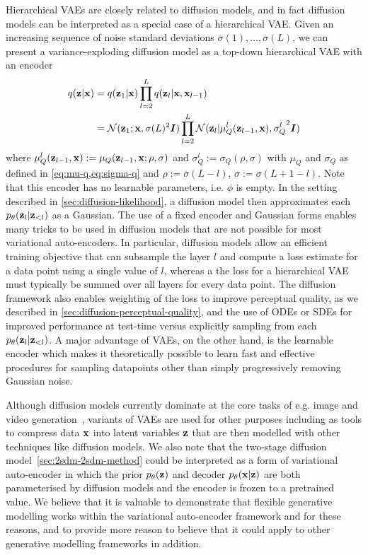 Hierarchical VAEs are closely related to diffusion models, and in fact diffusion models can be interpreted as a special case of a hierarchical VAE. Given an increasing sequence of noise standard deviations $\sigma(1),\ldots,\sigma(L)$, we can present a variance-exploding diffusion model as a top-down hierarchical VAE with an encoder
\begin{align}
    q({\mathbf{z}}|{\mathbf{x}}) &= q({\mathbf{z}}_1|{\mathbf{x}}) \prod_{l=2}^L q({\mathbf{z}}_l | {\mathbf{x}}, {\mathbf{x}}_{l-1}) \\
    &= {\mathcal{N}}( {\mathbf{z}}_1 ; {\mathbf{x}}, \sigma(L)^2 {\bm{I}} ) \prod_{l=2}^L {\mathcal{N}}( {\mathbf{z}}_l | \mu^l_Q({\mathbf{z}}_{l-1}, {\mathbf{x}}), {\sigma_Q^l}^2 {\bm{I}} )
\end{align}
where $\mu^l_Q({\mathbf{z}}_{l-1}, {\mathbf{x}}) := \mu_Q({\mathbf{z}}_{l-1}, {\mathbf{x}}; \rho, \sigma)$ and $\sigma^l_Q := \sigma_Q(\rho, \sigma)$ with $\mu_Q$ and $\sigma_Q$ as defined in \cref{eq:mu-q,eq:sigma-q} and $\rho := \sigma(L-l)$, $\sigma := \sigma(L+1-l)$. Note that this encoder has no learnable parameters, i.e. $\phi$ is empty. In the setting described in \cref{sec:diffusion-likelihood}, a diffusion model then approximates each $p_\theta({\mathbf{z}}_l|{\mathbf{z}}_{<l})$ as a Gaussian. The use of a fixed encoder and Gaussian forms enables many tricks to be used in diffusion models that are not possible for most variational auto-encoders. In particular, diffusion models allow an efficient training objective that can subsample the layer $l$ and compute a loss estimate for a data point using a single value of $l$, whereas a the loss for a hierarchical VAE must typically be summed over all layers for every data point. The diffusion framework also enables weighting of the loss to improve perceptual quality, as we described in \cref{sec:diffusion-perceptual-quality}, and the use of ODEs or SDEs for improved performance at test-time versus explicitly sampling from each $p_\theta({\mathbf{z}}_l|{\mathbf{z}}_{<l})$.
A major advantage of VAEs, on the other hand, is the learnable encoder which makes it theoretically possible to learn fast and effective procedures for sampling datapoints other than simply progressively removing Gaussian noise. 

Although diffusion models currently dominate at the core tasks of e.g. image and video generation~\citep{esser2024scaling,brooks2024video}, variants of VAEs are used for other purposes including as tools to compress data ${\mathbf{x}}$ into latent variables ${\mathbf{z}}$ that are then modelled with other techniques like diffusion models. We also note that the two-stage diffusion model~\cref{sec:2sdm-2sdm-method} could be interpreted as a form of variational auto-encoder in which the prior $p_\theta({\mathbf{z}})$ and decoder $p_\theta({\mathbf{x}}|{\mathbf{z}})$ are both parameterised by diffusion models and the encoder is frozen to a pretrained value. We believe that it is valuable to demonstrate that flexible generative modelling works within the variational auto-encoder framework and for these reasons, and to provide more reason to believe that it could apply to other generative modelling frameworks in addition.

